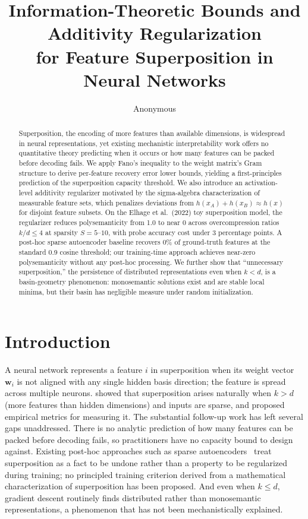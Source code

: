 \documentclass[11pt]{article}
\title{Information-Theoretic Bounds and Additivity Regularization\\
       for Feature Superposition in Neural Networks}
\author{Anonymous}
\date{}
\begin{document}
\maketitle

\begin{abstract}
Superposition, the encoding of more features than available dimensions, is widespread in neural
representations, yet existing mechanistic interpretability work offers no quantitative theory
predicting when it occurs or how many features can be packed before decoding fails. We apply
Fano's inequality to the weight matrix's Gram structure to derive per-feature recovery error
lower bounds, yielding a first-principles prediction of the superposition capacity threshold.
We also introduce an activation-level additivity regularizer motivated by the sigma-algebra
characterization of measurable feature sets, which penalizes deviations from
$h(x_A) + h(x_B) \approx h(x)$ for disjoint feature subsets. On the Elhage et al.\ (2022)
toy superposition model, the regularizer reduces polysemanticity from 1.0 to near 0 across
overcompression ratios $k/d \leq 4$ at sparsity $S = 5$--$10$, with probe accuracy cost
under 3 percentage points. A post-hoc sparse autoencoder baseline recovers 0\% of
ground-truth features at the standard 0.9 cosine threshold; our training-time approach
achieves near-zero polysemanticity without any post-hoc processing. We further show that
``unnecessary superposition,'' the persistence of distributed representations even when
$k < d$, is a basin-geometry phenomenon: monosemantic solutions exist and are stable local
minima, but their basin has negligible measure under random initialization.
\end{abstract}

\section{Introduction}

A neural network represents a feature $i$ in superposition when its weight vector
$\mathbf{w}_i$ is not aligned with any single hidden basis direction; the feature is spread
across multiple neurons. \citet{elhage2022toy} showed that superposition arises naturally when
$k > d$ (more features than hidden dimensions) and inputs are sparse, and proposed empirical
metrics for measuring it. The substantial follow-up work has left several gaps unaddressed.
There is no analytic prediction of how many features can be packed before decoding fails, so
practitioners have no capacity bound to design against. Existing post-hoc approaches such as
sparse autoencoders~\citep{bricken2023monosemanticity} treat superposition as a fact to be
undone rather than a property to be regularized during training; no principled training
criterion derived from a mathematical characterization of superposition has been proposed.
And even when $k \leq d$, gradient descent routinely finds distributed rather than monosemantic
representations, a phenomenon that has not been mechanistically explained.
\end{document}
